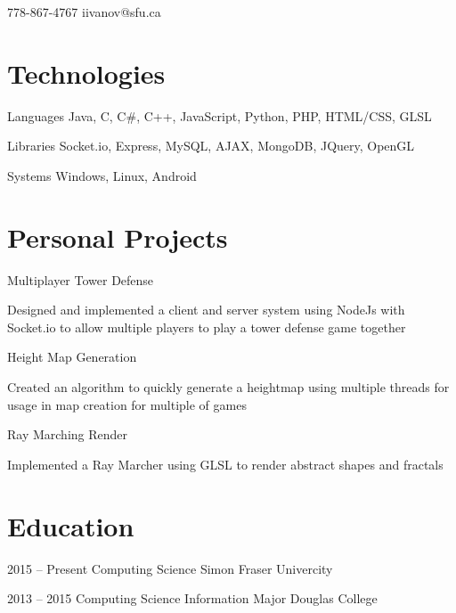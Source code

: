 \documentclass{tccv}
\begin{document}
    {778-867-4767}
    {iivanov@sfu.ca}

\section{Technologies}

\begin{factlist}
	
	\item{Languages}
	{Java, C, C\#, C++, JavaScript, Python, PHP, HTML/CSS, GLSL}
	
	\item{Libraries}
	{Socket.io, Express, MySQL, AJAX, MongoDB, JQuery, OpenGL}
	
	\item{Systems}
	{Windows, Linux, Android}
	
	
\end{factlist}

\section{Personal Projects}

\begin{projectlist}

\item{Multiplayer Tower Defense}

Designed and implemented a client and server system using NodeJs with
Socket.io to allow multiple players to play a tower defense game together	

\item{Height Map Generation}

Created an algorithm to quickly generate a heightmap using multiple
threads for usage in map creation for multiple of games

\item{Ray Marching Render}

Implemented a Ray Marcher using GLSL to render abstract shapes and fractals



\end{projectlist}



%

\section{Education}

\begin{yearlist}
	
	\item{2015 -- Present \hfill}
	{Computing Science}
	{Simon Fraser Univercity}
	
	\item{2013 -- 2015 \hfill}
	{Computing Science Information Major}
	{Douglas College}
	
\end{yearlist}
\end{document}
